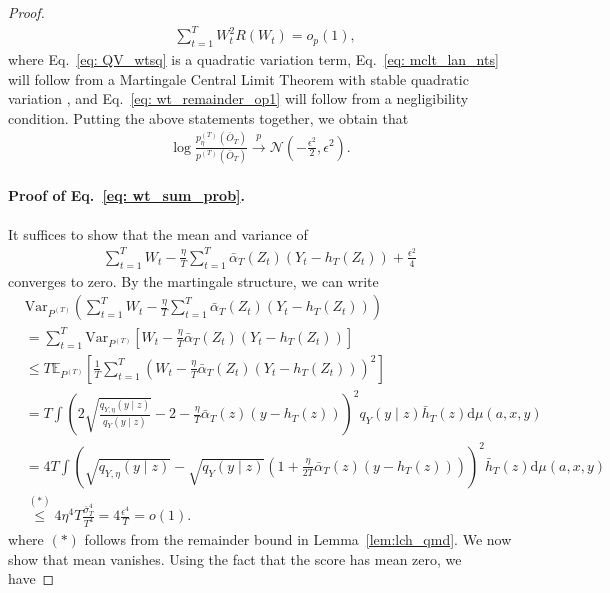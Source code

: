 \documentclass[11pt]{article}
\begin{document}
\begin{proof}
\begin{align}
        \label{eq: wt_remainder_op1}&\sum_{t=1}^{T}W_t^2R(W_t) = o_p(1), \tag{REM}
    \end{align}
    where Eq.~\eqref{eq: QV_wtsq} is a quadratic variation term, Eq.~\eqref{eq: mclt_lan_nts} will follow from a Martingale Central Limit Theorem with stable quadratic variation \citep[Theorem 3.2]{hall1980}, and Eq.~\eqref{eq: wt_remainder_op1} will follow from a negligibility condition. Putting the above statements together, we obtain that
    \begin{align*}
        \log \frac{p_{\eta}^{(T)}(\bar{O}_T)}{p^{(T)}(\bar{O}_T)} \overset{p}{\rightarrow}\mathcal{N}\left(-\frac{\epsilon^2}{2}, \epsilon^2\right).
    \end{align*}

    \paragraph{Proof of Eq.~\eqref{eq: wt_sum_prob}.} It suffices to show that the mean and variance of 
    \begin{align*}
        \sum_{t=1}^{T}W_t - \frac{\eta}{T}\sum_{t=1}^{T}\bar{\alpha}_T(Z_t)(Y_t - h_T(Z_t)) + \frac{\epsilon^2}{4}
    \end{align*}
    converges to zero. By the martingale structure, we can write
    \begin{align*}
        &\mathrm{Var}_{P^{(T)}}\left(\sum_{t=1}^{T}W_t - \frac{\eta}{T}\sum_{t=1}^{T}\bar{\alpha}_T(Z_t)(Y_t - h_T(Z_t))\right)\\
        &= \sum_{t=1}^{T}\mathrm{Var}_{P^{(T)}}\left[W_t - \frac{\eta}{T}\bar{\alpha}_T(Z_t)(Y_t - h_T(Z_t))\right]\\
                &\leq T\mathbb{E}_{P^{(T)}}\left[\frac{1}{T}\sum_{t=1}^{T}\left(W_t - \frac{\eta}{T}\bar{\alpha}_T(Z_t)(Y_t - h_T(Z_t))\right)^2\right]\\
        &=T \int \left(2\sqrt{\frac{q_{Y,\eta}(y\mid z)}{q_Y(y\mid z)}} -2 - \frac{\eta}{T}\bar{\alpha}_T(z)(y - h_T(z)) \right)^2q_Y(y\mid z)\bar{h}_T(z)\mathrm{d}\mu(a,x,y)\\
        &= 4T\int \left(\sqrt{q_{Y,\eta}(y\mid z)} - \sqrt{q_Y(y\mid z)}\left(1 +  \frac{\eta}{2T}\bar{\alpha}_T(z)(y - h_T(z))\right) \right)^2\bar{h}_T(z)\mathrm{d}\mu(a,x,y)\\
        &\stackrel{(\ast)}{\leq} 4\eta^4 T\frac{\bar{\sigma}_T^4}{T^4} = 4\frac{\epsilon^4}{T} = o(1). 
        \end{align*}
        where $(\ast)$ follows from the remainder bound in Lemma~\ref{lem:lch_qmd}. We now show that mean vanishes. Using the fact that the score has mean zero, we have 

\end{proof}
\end{document}
